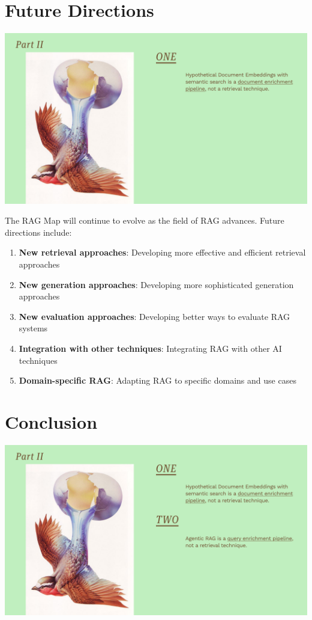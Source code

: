 \documentclass[
  letterpaper,
  oneside]{scrbook}
\providecommand{\tightlist}{%
  \setlength{\itemsep}{0pt}\setlength{\parskip}{0pt}}\usepackage{longtable,booktabs,array}
\begin{document}
\section{Future Directions}\label{future-directions-2}

\includegraphics{chapters/../p5-images/slide_10.png}

The RAG Map will continue to evolve as the field of RAG advances. Future
directions include:

\begin{enumerate}
\def\labelenumi{\arabic{enumi}.}
\tightlist
\item
  \textbf{New retrieval approaches}: Developing more effective and
  efficient retrieval approaches
\item
  \textbf{New generation approaches}: Developing more sophisticated
  generation approaches
\item
  \textbf{New evaluation approaches}: Developing better ways to evaluate
  RAG systems
\item
  \textbf{Integration with other techniques}: Integrating RAG with other
  AI techniques
\item
  \textbf{Domain-specific RAG}: Adapting RAG to specific domains and use
  cases
\end{enumerate}

\section{Conclusion}\label{conclusion-4}

\includegraphics{chapters/../p5-images/slide_11.png}
\end{document}
